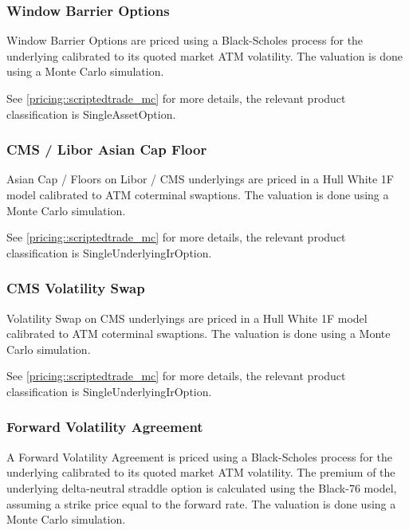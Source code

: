 \subsubsection{Window Barrier Options}
\label{pricing::windowbarrieroption}

Window Barrier Options are priced using a Black-Scholes process for the
underlying calibrated to its quoted market ATM volatility.
The valuation is done using a Monte Carlo simulation.

See \ref{pricing::scriptedtrade_mc} for more details, the relevant product classification is SingleAssetOption.

\subsubsection{CMS / Libor Asian Cap Floor}
\label{pricing::ir_asian_capfloor}

Asian Cap / Floors on Libor / CMS underlyings are priced in a Hull White 1F model calibrated to ATM coterminal
swaptions. The valuation is done using a Monte Carlo simulation.

See \ref{pricing::scriptedtrade_mc} for more details, the relevant product classification is SingleUnderlyingIrOption.

\subsubsection{CMS Volatility Swap}
\label{pricing::ir_cms_volatilityswap}

Volatility Swap on CMS underlyings are priced in a Hull White 1F model calibrated to ATM coterminal
swaptions. The valuation is done using a Monte Carlo simulation.

See \ref{pricing::scriptedtrade_mc} for more details, the relevant product classification is SingleUnderlyingIrOption.

\subsubsection{Forward Volatility Agreement}
\label{pricing::forward_volatility_agreement}

A Forward Volatility Agreement is priced using a Black-Scholes process for the underlying calibrated to its quoted
market ATM volatility. The premium of the underlying delta-neutral straddle option is calculated using the Black-76
model, assuming a strike price equal to the forward rate. The valuation is done using a Monte Carlo simulation.

